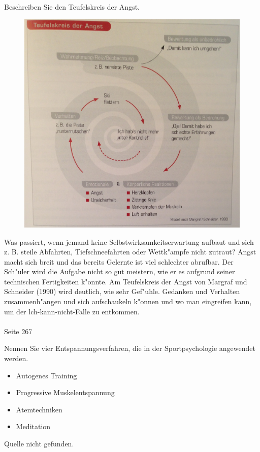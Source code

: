 \begin{question}{6}
Beschreiben Sie den Teufelskreis der Angst.
\end{question}
\begin{solution}
\begin{figure}[H]
  \centering
  \includegraphics[width=12cm]{pic/angst.jpg}
  \label{fig:angst}
\end{figure}
Was passiert, wenn jemand keine Selbstwirksamkeitserwartung aufbaut und sich z. B. steile Abfahrten, Tiefschneefahrten oder Wettk"ampfe nicht zutraut? Angst macht sich breit und das bereits Gelernte ist viel schlechter abrufbar. Der Sch"uler wird die Aufgabe nicht so gut meistern, wie er es aufgrund seiner technischen Fertigkeiten k"onnte. Am Teufelskreis der Angst von Margraf und Schneider (1990) wird deutlich, wie sehr Gef"uhle. Gedanken und Verhalten zusammenh"angen und sich aufschaukeln k"onnen und wo man eingreifen kann, um der lch-kann-nicht-Falle zu entkommen.\\\\
 Seite 267
\end{solution}

\begin{question}{2}
Nennen Sie vier Entspannungsverfahren, die in der Sportpsychologie angewendet werden.
\end{question}
\begin{solution}
\begin{itemize}
\item Autogenes Training
\item Progressive Muskelentspannung
\item Atemtechniken
\item Meditation
\end{itemize}
Quelle nicht gefunden.
\end{solution}